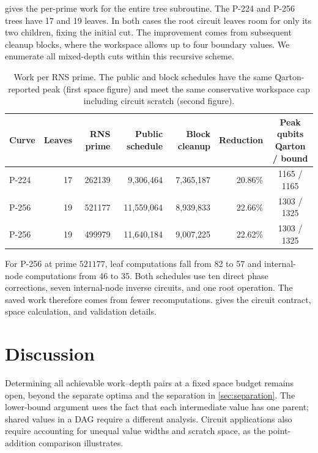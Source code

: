 \documentclass[11pt]{article}
\theoremstyle{definition}
\theoremstyle{remark}
\begin{document}
 gives the per-prime work for the entire tree subroutine. The P-224 and P-256 trees have 17 and 19 leaves. In both cases the root circuit leaves room for only its two children, fixing the initial cut. The improvement comes from subsequent cleanup blocks, where the workspace allows up to four boundary values. We enumerate all mixed-depth cuts within this recursive scheme.

\begin{table}[H]
\centering
\small
\setlength{\tabcolsep}{3.2pt}
\renewcommand{\arraystretch}{1.15}
\begin{tabular}{@{}lrrrrrc@{}}
\toprule
Curve & Leaves & RNS prime & Public schedule & Block cleanup & Reduction & \shortstack{Peak qubits\\Qarton / bound} \\
\midrule
P-224 & 17 & 262139 & 9,306,464 & 7,365,187 & 20.86\% & 1165 / 1165 \\
P-256 & 19 & 521177 & 11,559,064 & 8,939,833 & 22.66\% & 1303 / 1325 \\
P-256 & 19 & 499979 & 11,640,184 & 9,007,225 & 22.62\% & 1303 / 1325 \\
\bottomrule
\end{tabular}
\caption{Work per RNS prime. The public and block schedules have the same Qarton-reported peak (first space figure) and meet the same conservative workspace cap including circuit scratch (second figure).}
\label{tab:cfs-application}
\end{table}

For P-256 at prime $521177$, leaf computations fall from 82 to 57 and internal-node computations from 46 to 35. Both schedules use ten direct phase corrections, seven internal-node inverse circuits, and one root operation. The saved work therefore comes from fewer recomputations.  gives the circuit contract, space calculation, and validation details.

\section{Discussion}

Determining all achievable work--depth pairs at a fixed space budget remains open, beyond the separate optima and the separation in \cref{sec:separation}. The lower-bound argument uses the fact that each intermediate value has one parent; shared values in a DAG require a different analysis. Circuit applications also require accounting for unequal value widths and scratch space, as the point-addition comparison illustrates.
\end{document}
